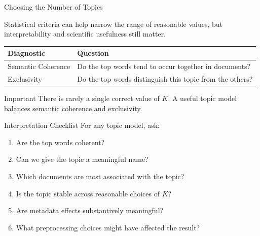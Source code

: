 \documentclass[aspectratio=169]{beamer}
\begin{document}
\begin{frame}{Choosing the Number of Topics}

\centering
Statistical criteria can help narrow the range of
reasonable values, but interpretability and scientific
usefulness still matter.

\pause
\vspace{0.3cm}
\renewcommand{\arraystretch}{1.4}

\begin{tabular}{|p{5cm}|p{7cm}|}
\hline
\textbf{Diagnostic} & \textbf{Question} \\
\hline
Semantic Coherence &
Do the top words tend to occur together in documents? \\
\hline
Exclusivity &
Do the top words distinguish this topic from the others? \\
\hline
\end{tabular}

\vspace{0.3cm}
\pause
\centering
\begin{alertblock}{Important}
There is rarely a single correct value of $K$. A useful topic model balances semantic coherence and exclusivity.
\end{alertblock}


\end{frame}
\begin{frame}{Interpretation Checklist}
For any topic model, ask:

\begin{enumerate}
  \item Are the top words coherent?
  \item Can we give the topic a meaningful name?
  \item Which documents are most associated with the topic?
  \item Is the topic stable across reasonable choices of $K$?
  \item Are metadata effects substantively meaningful?
  \item What preprocessing choices might have affected the result?
\end{enumerate}
\end{frame}
\end{document}
